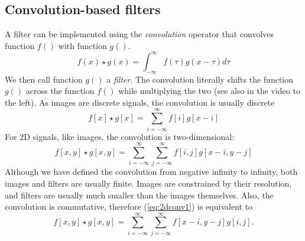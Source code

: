 \subsection{Convolution-based filters}
 A filter can be implemented using the \emph{convolution} operator that convolves function $f()$ with function $g()$.
\begin{equation}
f(x)\star g(x)=\int_{-\infty}^{\infty}f(\tau)g(x-\tau)d\tau
\end{equation}
We then call function $g()$ a \emph{filter}. 
The convolution literally shifts the function $g()$ across the function $f()$ while multiplying the two (see also in the video to the left). As images are discrete signals, the convolution is usually discrete
\begin{equation}
f[x]\star g[x]=\sum_{i=-\infty}^{\infty}f[i]g[x-i]
\end{equation}
For 2D signals, like images, the convolution is two-dimensional:
\begin{equation}\label{eq:2dconv1}
f[x,y]\star g[x,y]=\sum_{i=-\infty}^{\infty}\sum_{j=-\infty}^{\infty}f[i,j]g[x-i,y-j]
\end{equation}
Although we have defined the convolution from negative infinity to infinity, both images and filters are usually finite. Images are constrained by their resolution, and filters are usually much smaller than the images themselves. Also, the convolution is commutative, therefore (\ref{eq:2dconv1}) is equivalent to
\begin{equation}\label{eq:2dconv2}
f[x,y]\star g[x,y]=\sum_{i=-\infty}^{\infty}\sum_{j=-\infty}^{\infty}f[x-i,y-j]g[i,j].
\end{equation}

